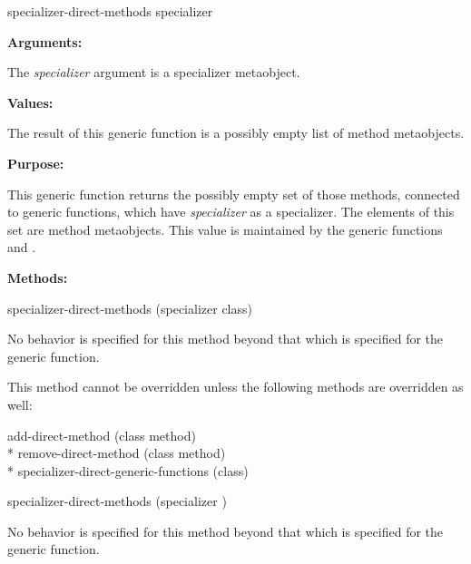 \begin{defun}
specializer-direct-methods specializer

\textbf{Arguments:}

The \emph{specializer} argument is a specializer metaobject.

\textbf{Values:}

The result of this generic function is a possibly empty list of method metaobjects.

\textbf{Purpose:}

This generic function returns the possibly empty set of those methods, connected
to generic functions, which have \emph{specializer} as a specializer. The elements of
this set are method metaobjects. This value is maintained by the generic
functions  and .

\textbf{Methods:}

\begin{defun}
specializer-direct-methods (specializer class)

No behavior is specified for this method beyond that which is specified for the generic function.

This method cannot be overridden unless the following methods are overridden as well:

\begin{tabbing}
    add-direct-method (class method)\\*
    remove-direct-method (class method)\\*
    specializer-direct-generic-functions (class)
\end{tabbing}

\end{defun}

\begin{defun}
specializer-direct-methods (specializer )

No behavior is specified for this method beyond that which is specified for the
generic function.
\end{defun}
\end{defun}

